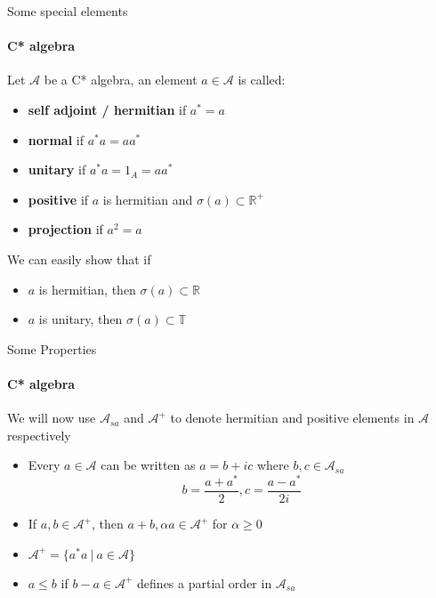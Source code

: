 \documentclass[dvipsnames]{beamer}
\newcommand{\1}{\mathds{1}}	%
\begin{document}
\begin{frame}{Some special elements}
\framesubtitle{C* algebra}
\begin{definition}
  Let $\mathcal{A}$ be a C* algebra, an element $a \in \mathcal{A}$ is called:
  \begin{itemize}
    \item \textbf{self adjoint / hermitian} if $a^* = a$ \pause
    \item {\bf normal} if $a^*a = aa^*$ \pause
    \item {\bf unitary} if $a^*a = 1_A = aa^*$ \pause
    \item {\bf positive} if $a$ is hermitian and $\sigma(a) \subset \mathbb{R}^+$ \pause
    \item {\bf projection} if $a^2 = a$
  \end{itemize}
\end{definition}

\pause
We can easily show that if
\begin{itemize}
  \item $a$ is hermitian, then $\sigma(a) \subset \mathbb{R}$ \pause
  \item $a$ is unitary, then $\sigma(a) \subset \mathbb{T}$ 
\end{itemize}
\end{frame}

\begin{frame}{Some Properties}
\framesubtitle{C* algebra}
  We will now use $\mathcal{A}_{sa}$ and $\mathcal{A}^+$ to denote hermitian and positive elements in $\mathcal{A}$ respectively \pause 
  \begin{itemize}
    \item Every $a \in \mathcal{A}$ can be written as $a = b + ic$ where $b, c \in \mathcal{A}_{sa}$ \pause $$b = \frac{a + a^*}{2}, c = \frac{a - a^*}{2i}$$ \pause
    \item If $a, b \in \mathcal{A}^+$, then $a+b, \alpha a \in \mathcal{A}^+$ for $\alpha \ge 0$ \pause
    \item $\mathcal{A}^+ = \{a^*a \ | \ a \in \mathcal{A}\}$ \pause
    \item $a \le b$ if $b - a \in \mathcal{A}^+$ defines a partial order in $\mathcal{A}_{sa}$
  \end{itemize}
\end{frame}
\end{document}

